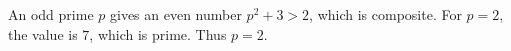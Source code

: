 An odd prime $p$ gives an even number $p^2+3>2$, which is composite. For $p=2$, the value is $7$, which is prime. Thus $\boxed{p=2}$.
